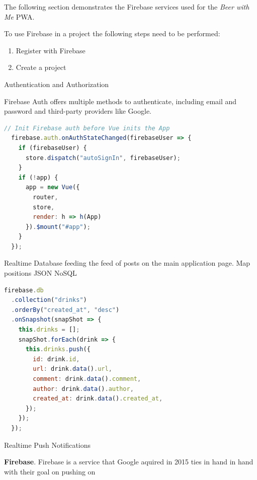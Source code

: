 The following section demonstrates the Firebase services used for the \textit{Beer with Me} PWA.

To use Firebase in a project the following steps need to be performed:
\begin{enumerate}
  \item Register with Firebase
  \item Create a project
\end{enumerate}

Authentication and Authorization

Firebase Auth offers multiple methods to authenticate, including email and password and third-party providers like Google.

\begin{lstlisting}[language=JavaScript, caption=Firebase Auth initiation using VueJS (main.js), label=lst:firebase-auth]
  // Init Firebase auth before Vue inits the App
  firebase.auth.onAuthStateChanged(firebaseUser => {
    if (firebaseUser) {
      store.dispatch("autoSignIn", firebaseUser);
    }
    if (!app) {
      app = new Vue({
        router,
        store,
        render: h => h(App)
      }).$mount("#app");
    }
  });
\end{lstlisting}

Realtime Database feeding the feed of posts on the main application page. Map positions
JSON NoSQL

\begin{lstlisting}[language=JavaScript, caption=Realtime query for new posts (Home.vue), label=lst:firebase-listposts]
firebase.db
  .collection("drinks")
  .orderBy("created_at", "desc")
  .onSnapshot(snapShot => {
    this.drinks = [];
    snapShot.forEach(drink => {
      this.drinks.push({
        id: drink.id,
        url: drink.data().url,
        comment: drink.data().comment,
        author: drink.data().author,
        created_at: drink.data().created_at,
      });
    });
  });
\end{lstlisting}

Realtime Push Notifications

\textbf{Firebase}. Firebase is a service that Google aquired in 2015 ties in hand in hand with their goal on pushing on
